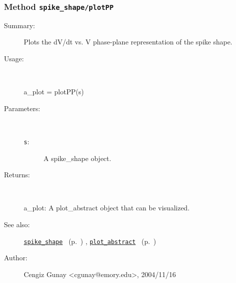 \subsubsection[Method \texttt{plotPP}]{Method \texttt{spike\_shape/plotPP}}%
%
\label{ref_spike_shape__plotPP}%
\hypertarget{ref_spike_shape__plotPP}{}%
\begin{description}
\item[Summary:]Plots the dV/dt vs. V phase-plane representation of the spike shape.
%
\item[Usage:]~%
\begin{lyxcode}%
a\_plot = plotPP(s)
%
\end{lyxcode}%
%
%
\item[Parameters:]~
\begin{description}%
\item[\texttt{s}:]
 A spike\_shape object.
\end{description}%
%
\item[Returns:]~

	a\_plot: A plot\_abstract object that can be visualized.
%
%
\item[See also:]%
\hyperlink{ref_spike_shape}{\texttt{spike\_shape}}%
\ (p.~\pageref{ref_spike_shape})%
%
, \hyperlink{ref_plot_abstract}{\texttt{plot\_abstract}}%
\ (p.~\pageref{ref_plot_abstract})%
%
%
\item[Author:]%
Cengiz Gunay <cgunay@emory.edu>, 2004/11/16%
\end{description}
\methodline%
